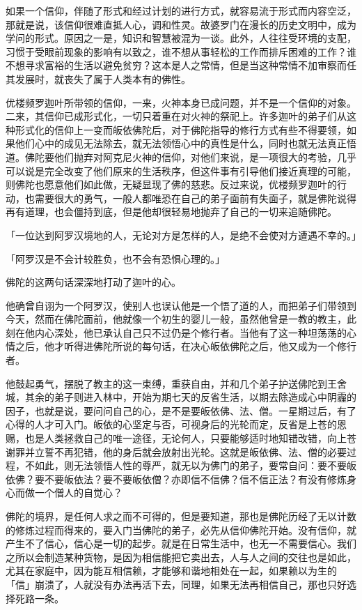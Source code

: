 \documentclass[twoside,openany]{book}
\begin{document}
如果一个信仰，伴随了形式和经过计划的进行方式，就容易流于形式而内容空泛，那就是说，该信仰很难直抵人心，调和性灵。故婆罗门在漫长的历史文明中，成为学问的形式。原因之一是，知识和智慧被混为一谈。此外，人往往受环境的支配，习惯于受眼前现象的影响有以致之，谁不想从事轻松的工作而排斥困难的工作？谁不想寻求富裕的生活以避免贫穷？这本是人之常情，但是当这种常情不加审察而任其发展时，就丧失了属于人类本有的佛性。

优楼频罗迦叶所带领的信仰，一来，火神本身已成问题，并不是一个信仰的对象。二来，其信仰已成形式化，一切只着重在对火神的祭祀上。许多迦叶的弟子们从这种形式化的信仰上一变而皈依佛陀后，对于佛陀指导的修行方式有些不得要领，如果他们心中的成见无法除去，就无法领悟心中的真性是什么，同时也就无法真正悟道。佛陀要他们抛弃对阿克尼火神的信仰，对他们来说，是一项很大的考验，几乎可以说是完全改变了他们原来的生活秩序，但这件事有引导他们接近真理的可能，则佛陀也愿意他们如此做，无疑显现了佛的慈悲。反过来说，优楼频罗迦叶的行动，也需要很大的勇气，一般人都唯恐在自己的弟子面前有失面子，就是佛陀说得再有道理，也会僵持到底，但是他却很轻易地抛弃了自己的一切来追随佛陀。

「一位达到阿罗汉境地的人，无论对方是怎样的人，是绝不会使对方遭遇不幸的。」

「阿罗汉是不会计较胜负，也不会有恐惧心理的。」

佛陀的这两句话深深地打动了迦叶的心。

他确曾自诩为一个阿罗汉，使别人也误认他是一个悟了道的人，而把弟子们带领到今天，然而在佛陀面前，他就像一个初生的婴儿一般，虽然他曾是一教的教主，此刻在他内心深处，他已承认自己只不过仍是个修行者。当他有了这一种坦荡荡的心情之后，他才听得进佛陀所说的每句话，在决心皈依佛陀之后，他又成为一个修行者。

他鼓起勇气，摆脱了教主的这一束缚，重获自由，并和几个弟子护送佛陀到王舍城，其余的弟子则进入林中，开始为期七天的反省生活，以期去除造成心中阴霾的因子，也就是说，要问问自己的心，是不是要皈依佛、法、僧。一星期过后，有了心得的人才可入门。皈依的心坚定与否，可视身后的光轮而定，反省是上苍的恩赐，也是人类拯救自己的唯一途径，无论何人，只要能够适时地知错改错，向上苍谢罪并立誓不再犯错，他的身后就会放射出光轮。这就是皈依佛、法、僧的必要过程，不如此，则无法领悟人性的尊严，就无以为佛门的弟子，要常自问：要不要皈依佛？要不要皈依法？要不要皈依僧？亦即信不信佛？信不信正法？有没有修炼身心而做一个僧人的自觉心？

佛陀的境界，是任何人求之而不可得的，但是要知道，那也是佛陀历经了无以计数的修炼过程而得来的，要入门当佛陀的弟子，必先从信仰佛陀开始。没有信仰，就产生不了信心，信心是一切的起步。就是在日常生活中，也无一不需要信心。我们之所以会制造某种货物，是因为相信能把它卖出去，人与人之间的交往也是如此，尤其在家庭中，因为能互相信赖，才能够和谐地相处在一起，如果赖以为生的「信」崩溃了，人就没有办法再活下去，同理，如果无法再相信自己，那也只好选择死路一条。
\end{document}
